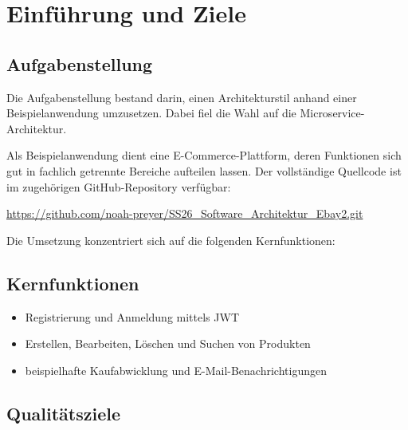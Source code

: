 \section{Einführung und Ziele}

\subsection{Aufgabenstellung}

Die Aufgabenstellung bestand darin, einen Architekturstil anhand einer
Beispielanwendung umzusetzen.
Dabei fiel die Wahl auf die Microservice-Architektur.

Als Beispielanwendung dient eine E-Commerce-Plattform,
deren Funktionen sich gut in fachlich getrennte Bereiche aufteilen lassen.
Der vollständige Quellcode ist im zugehörigen GitHub-Repository verfügbar:

\begin{center}
    \url{https://github.com/noah-preyer/SS26_Software_Architektur_Ebay2.git}
\end{center}

Die Umsetzung konzentriert sich auf die folgenden Kernfunktionen:

\subsection{Kernfunktionen}

\begin{itemize}
\item Registrierung und Anmeldung mittels JWT
\item Erstellen, Bearbeiten, Löschen und Suchen von Produkten
\item beispielhafte Kaufabwicklung und E-Mail-Benachrichtigungen
\end{itemize}


\subsection{Qualitätsziele}

